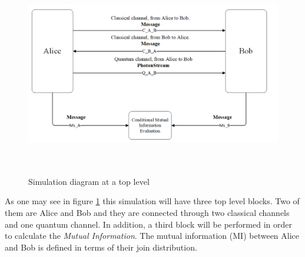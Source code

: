 \begin{figure}[H]
	\centering
	\includegraphics[width=1.0\textwidth, height=9cm]{./sdf/ot_with_discrete_variables/figures/Simulation_diagram_top.png}
	\caption{Simulation diagram at a top level}\label{toplevelsimulation}
\end{figure}

As one may see in figure \ref{toplevelsimulation} this simulation will have three top level blocks. Two of them are Alice and Bob and they are connected through two classical channels and one quantum channel. In addition, a third block will be performed in order to calculate the \textit{Mutual Information}. The mutual information (MI) between Alice and Bob is defined in terms of their join distribution.


